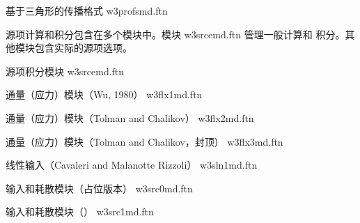 \noindent
基于三角形的传播格式 \hfill {\file w3profsmd.ftn}

\begin{flisti}
\end{flisti}

\vspace{\baselineskip} \noindent
源项计算和积分包含在多个模块中。模块 {\file w3srcemd.ftn} 管理一般计算和
积分。其他模块包含实际的源项选项。

\vspace{\baselineskip} \noindent
源项积分模块 \hfill {\file w3srcemd.ftn}

\begin{flisti}
\end{flisti}

\noindent
通量（应力）模块（Wu, 1980） \hfill {\file w3flx1md.ftn}

\begin{flisti}
\end{flisti}

\noindent
通量（应力）模块（Tolman and Chalikov） \hfill {\file w3flx2md.ftn}

\begin{flisti}
\end{flisti}

\noindent
通量（应力）模块（Tolman and Chalikov，封顶） \hfill {\file w3flx3md.ftn}

\begin{flisti}
\end{flisti}

\noindent
线性输入（Cavaleri and Malanotte Rizzoli） \hfill {\file w3sln1md.ftn}

\begin{flisti}
\end{flisti}

\noindent
输入和耗散模块（占位版本） \hfill {\file w3src0md.ftn}

\begin{flisti}
\end{flisti}

\noindent
输入和耗散模块（） \hfill {\file w3src1md.ftn}

